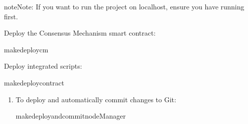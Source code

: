 \documentclass[a4paper,10pt,english]{sphinxmanual}
\begin{document}
\begin{sphinxadmonition}{note}{Note:}
\sphinxAtStartPar
{} If you want to run the project on localhost, ensure you have  running first.

\sphinxAtStartPar
Deploy the Consensus Mechanism smart contract:

\begin{sphinxVerbatim}[commandchars=\\\{\}]
makedeploy\PYGZhy{}cm
\end{sphinxVerbatim}

\sphinxAtStartPar
Deploy integrated scripts:

\begin{sphinxVerbatim}[commandchars=\\\{\}]
makedeploy\PYGZhy{}contract
\end{sphinxVerbatim}
\end{sphinxadmonition}
\begin{enumerate}
%
\setcounter{enumi}{1}
\item {} 
\sphinxAtStartPar
{}

\sphinxAtStartPar
To deploy and automatically commit changes to Git:

\begin{sphinxVerbatim}[commandchars=\\\{\}]
makedeploy\PYGZhy{}and\PYGZhy{}commit\PYGZhy{}nodeManager
\end{sphinxVerbatim}

\end{enumerate}
\end{document}
